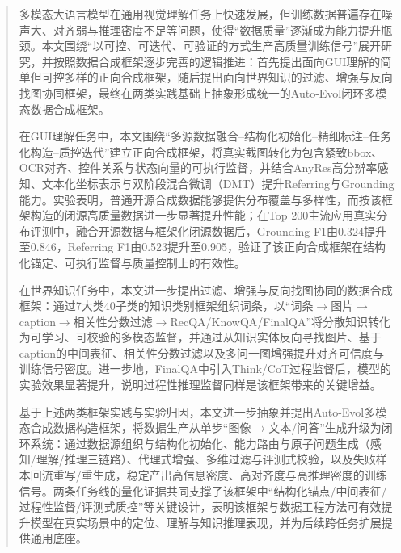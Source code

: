 \documentclass[type=master, twoside]{fduthesis}
\begin{document}
\raggedbottom

\frontmatter

\tableofcontents

\listoffigures

\listoftables

\begin{abstract}

多模态大语言模型在通用视觉理解任务上快速发展，但训练数据普遍存在噪声大、对齐弱与推理密度不足等问题，使得“数据质量”逐渐成为能力提升瓶颈。本文围绕“以可控、可迭代、可验证的方式生产高质量训练信号”展开研究，并按照数据合成框架逐步完善的逻辑推进：首先提出面向GUI理解的简单但可控多样的正向合成框架，随后提出面向世界知识的过滤、增强与反向找图协同框架，最终在两类实践基础上抽象形成统一的Auto-Evol闭环多模态数据合成框架。

在GUI理解任务中，本文围绕“多源数据融合--结构化初始化--精细标注--任务化构造--质控迭代”建立正向合成框架，将真实截图转化为包含紧致bbox、OCR对齐、控件关系与状态向量的可执行监督，并结合AnyRes高分辨率感知、文本化坐标表示与双阶段混合微调（DMT）提升Referring与Grounding能力。实验表明，普通开源合成数据能够提供分布覆盖与多样性，而按该框架构造的闭源高质量数据进一步显著提升性能；在Top 200主流应用真实分布评测中，融合开源数据与框架化闭源数据后，Grounding F1由0.324提升至0.846，Referring F1由0.523提升至0.905，验证了该正向合成框架在结构化锚定、可执行监督与质量控制上的有效性。

在世界知识任务中，本文进一步提出过滤、增强与反向找图协同的数据合成框架：通过7大类40子类的知识类别框架组织词条，以“词条$\rightarrow$图片$\rightarrow$caption$\rightarrow$相关性分数过滤$\rightarrow$RecQA/KnowQA/FinalQA”将分散知识转化为可学习、可校验的多模态监督，并通过从知识实体反向寻找图片、基于caption的中间表征、相关性分数过滤以及多问一图增强提升对齐可信度与训练信号密度。进一步地，FinalQA中引入Think/CoT过程监督后，模型的实验效果显著提升，说明过程性推理监督同样是该框架带来的关键增益。

基于上述两类框架实践与实验归因，本文进一步抽象并提出Auto-Evol多模态合成数据构造框架，将数据生产从单步“图像$\rightarrow$文本/问答”生成升级为闭环系统：通过数据源组织与结构化初始化、能力路由与原子问题生成（感知/理解/推理三链路）、代理式增强、多维过滤与评测式校验，以及失败样本回流重写/重生成，稳定产出高信息密度、高对齐度与高推理密度的训练信号。两条任务线的量化证据共同支撑了该框架中“结构化锚点/中间表征/过程性监督/评测式质控”等关键设计，表明该框架与数据工程方法可有效提升模型在真实场景中的定位、理解与知识推理表现，并为后续跨任务扩展提供通用底座。

\end{abstract}
\end{document}
